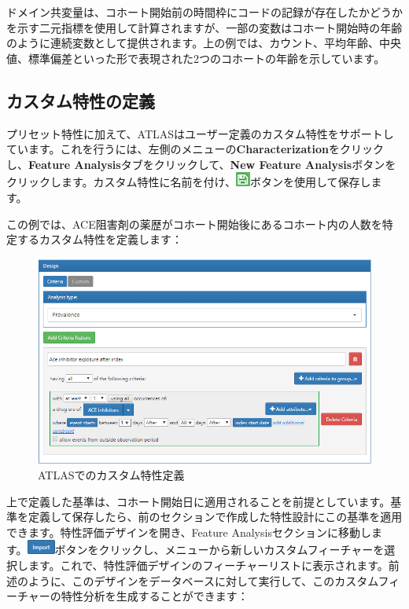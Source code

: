 \documentclass[
  11pt]{book}
\theoremstyle{definition}
\theoremstyle{definition}
\theoremstyle{definition}
\theoremstyle{definition}
\theoremstyle{remark}
\begin{document}
ドメイン共変量は、コホート開始前の時間枠にコードの記録が存在したかどうかを示す二元指標を使用して計算されますが、一部の変数はコホート開始時の年齢のように連続変数として提供されます。上の例では、カウント、平均年齢、中央値、標準偏差といった形で表現された2つのコホートの年齢を示しています。

\subsection{カスタム特性の定義}\label{ux30abux30b9ux30bfux30e0ux7279ux6027ux306eux5b9aux7fa9}

プリセット特性に加えて、ATLASはユーザー定義のカスタム特性をサポートしています。これを行うには、左側のメニューの\textbf{Characterization}をクリックし、\textbf{Feature Analysis}タブをクリックして、\textbf{New Feature Analysis}ボタンをクリックします。カスタム特性に名前を付け、\includegraphics{images/PopulationLevelEstimation/save.png}ボタンを使用して保存します。

この例では、ACE阻害剤の薬歴がコホート開始後にあるコホート内の人数を特定するカスタム特性を定義します：

\begin{figure}

{\centering \includegraphics[width=1\linewidth]{images/Characterization/atlasCharacterizationCustomFeature} 

}

\caption{ATLASでのカスタム特性定義}\label{fig:atlasCharacterizationCustomFeature}
\end{figure}

上で定義した基準は、コホート開始日に適用されることを前提としています。基準を定義して保存したら、前のセクションで作成した特性設計にこの基準を適用できます。特性評価デザインを開き、Feature Analysisセクションに移動します。\includegraphics{images/Characterization/atlasImportButton.png}ボタンをクリックし、メニューから新しいカスタムフィーチャーを選択します。これで、特性評価デザインのフィーチャーリストに表示されます。前述のように、このデザインをデータベースに対して実行して、このカスタムフィーチャーの特性分析を生成することができます：
\end{document}

